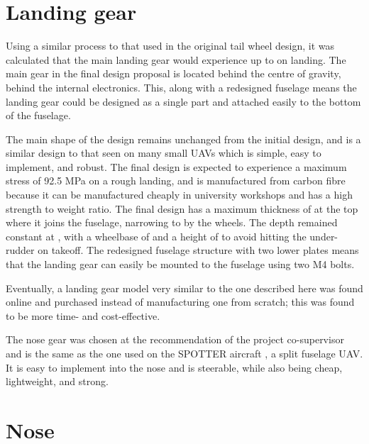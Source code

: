 \documentclass[../../main.tex]{subfiles}
\begin{document}
\section{Landing gear} \label{sec:final-design-proposal:landing-gear}

Using a similar process to that used in the original tail wheel design, it was calculated that the main landing gear would experience up to  on landing.  %
The main gear in the final design proposal is located behind the centre of gravity, behind the internal electronics.
This, along with a redesigned fuselage means the landing gear could be designed as a single part and attached easily to the bottom of the fuselage. 


The main shape of the design remains unchanged from the initial design, and is a similar design to that seen on many small UAVs which is simple, easy to implement, and robust.
The final design is expected to experience a maximum stress of 92.5 MPa on a rough landing, and is manufactured from carbon fibre because it can be manufactured cheaply in university workshops and has a high strength to weight ratio.
The final design has a maximum thickness of  at the top where it joins the fuselage, narrowing to  by the wheels.
The depth remained constant at , with a wheelbase of  and a height of  to avoid hitting the under-rudder on takeoff.
The redesigned fuselage structure with two lower plates means that the landing gear can easily be mounted to the fuselage using two M4 bolts. 

Eventually, a landing gear model very similar to the one described here was found online and purchased instead of manufacturing one from scratch; this was found to be more time- and cost-effective.


The nose gear was chosen at the recommendation of the project co-supervisor and is the same as the one used on the SPOTTER aircraft \cite{spotter-19}, a  split fuselage UAV.
It is easy to implement into the nose and is steerable, while also being cheap, lightweight, and strong. 

\section{Nose} \label{sec:final-design-proposal:nose}
\end{document}
